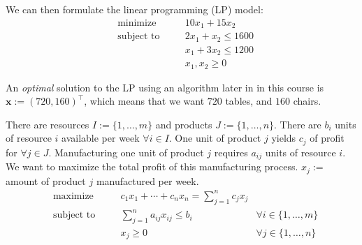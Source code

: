 \begin{exbox}
\begin{example}
        We can then formulate the linear programming (LP) model:
        \begin{equation}
            \begin{aligned}
                 & \text{minimize}   & \quad & 10x_1 + 15x_2             \\
                 & \text{subject to} &       & 2x_1 + x_2 \leqslant 1600 \\
                 &                   &       & x_1 + 3x_2 \leqslant 1200 \\
                 &                   &       & x_1, x_2 \geqslant  0
            \end{aligned}\tag{LP}
        \end{equation}

        An \emph{optimal} solution to the LP using an algorithm later in
        in this course is $ \bm{x}:=(720,160)^\top $, which means
        that we want $ 720 $ tables, and $ 160 $ chairs.
    \end{example}
\end{exbox}

\begin{exbox}
    \begin{example}
        There are resources $I:=\{1,\dots,m\}$ and products $J:=\{1,\dots,n\}$.
        There are $b_i$ units of resource
        $i$ available per week $\forall i\in I$. One unit of product $j$ yields $c_j$ of profit for
        $\forall j\in J$. Manufacturing one unit of product $j$ requires $a_{ij}$ units of resource $i$.
        We want to maximize the total profit of this manufacturing process.
        $x_j :=$ amount of product $j$ manufactured per week.
        \begin{equation}
            \begin{aligned}
                 & \text{maximize}   & \quad & c_1x_1 + \cdots + c_n x_n = \sum\limits_{j=1}^n c_j x_j                             \\
                 & \text{subject to} &       & \sum\limits_{j=1}^n a_{ij}x_{ij}\leqslant b_i           & \forall i\in\{1,\dots,m\} \\
                 &                   &       & x_j\geqslant  0                                         & \forall j\in\{1,\dots,n\}
            \end{aligned}\tag{LP}\label{1.2}
        \end{equation}
    \end{example}
\end{exbox}

